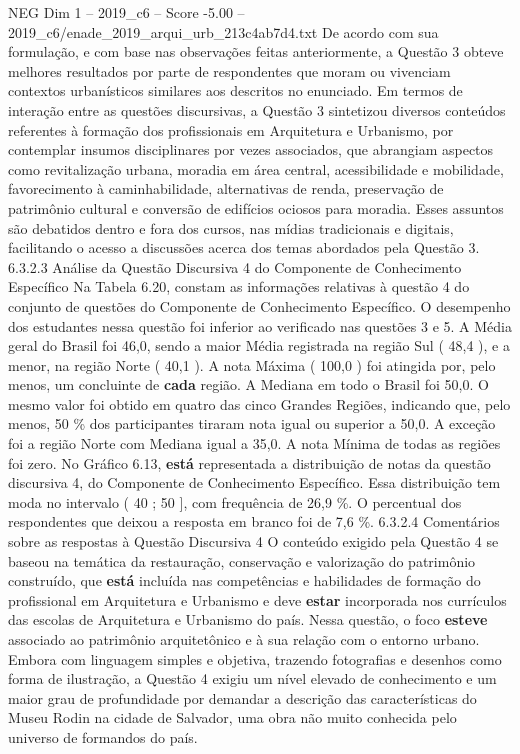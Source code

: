 \begin{textsample}{NEG Dim 1 – 2019\_c6 – Score -5.00 – 2019\_c6/enade\_2019\_arqui\_urb\_213c4ab7d4.txt}
De acordo com sua formulação, e com base nas observações feitas anteriormente, a Questão 3 obteve melhores resultados por parte de respondentes que moram ou vivenciam contextos urbanísticos similares aos descritos no enunciado.
Em termos de interação entre as questões discursivas, a Questão 3 sintetizou diversos conteúdos referentes à formação dos profissionais em Arquitetura e Urbanismo, por contemplar insumos disciplinares por vezes associados, que abrangiam aspectos como revitalização urbana, moradia em área central, acessibilidade e mobilidade, favorecimento à caminhabilidade, alternativas de renda, preservação de patrimônio cultural e conversão de edifícios ociosos para moradia.
Esses assuntos são debatidos dentro e fora dos cursos, nas mídias tradicionais e digitais, facilitando o acesso a discussões acerca dos temas abordados pela Questão 3. 6.3.2.3 Análise da Questão Discursiva 4 do Componente de Conhecimento Específico Na Tabela 6.20, constam as informações relativas à questão 4 do conjunto de questões do Componente de Conhecimento Específico.
O desempenho dos estudantes nessa questão foi inferior ao verificado nas questões 3 e 5.
A Média geral do Brasil foi 46,0, sendo a maior Média registrada na região Sul ( 48,4 ), e a menor, na região Norte ( 40,1 ).
A nota Máxima ( 100,0 ) foi atingida por, pelo menos, um concluinte de \textbf{cada} região.
A Mediana em todo o Brasil foi 50,0.
O mesmo valor foi obtido em quatro das cinco Grandes Regiões, indicando que, pelo menos, 50 \% dos participantes tiraram nota igual ou superior a 50,0.
A exceção foi a região Norte com Mediana igual a 35,0.
A nota Mínima de todas as regiões foi zero.
No Gráfico 6.13, \textbf{está} representada a distribuição de notas da questão discursiva 4, do Componente de Conhecimento Específico.
Essa distribuição tem moda no intervalo ( 40 ; 50 ], com frequência de 26,9 \%.
O percentual dos respondentes que deixou a resposta em branco foi de 7,6 \%. 6.3.2.4 Comentários sobre as respostas à Questão Discursiva 4 O conteúdo exigido pela Questão 4 se baseou na temática da restauração, conservação e valorização do patrimônio construído, que \textbf{está} incluída nas competências e habilidades de formação do profissional em Arquitetura e Urbanismo e deve \textbf{estar} incorporada nos currículos das escolas de Arquitetura e Urbanismo do país.
Nessa questão, o foco \textbf{esteve} associado ao patrimônio arquitetônico e à sua relação com o entorno urbano.
Embora com linguagem simples e objetiva, trazendo fotografias e desenhos como forma de ilustração, a Questão 4 exigiu um nível elevado de conhecimento e um maior grau de profundidade por demandar a descrição das características do Museu Rodin na cidade de Salvador, uma obra não muito conhecida pelo universo de formandos do país.

\end{textsample}
